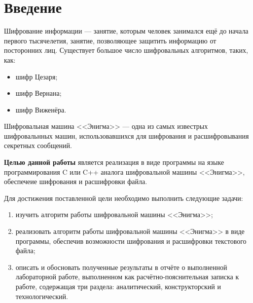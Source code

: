 \chapter*{Введение}

Шифрование информации --- занятие, которым человек занимался ещё до начала первого тысячелетия, занятие, позволяющее защитить информацию от посторонних лиц. 
Существует большое число шифровальных алгоритмов, таких, как:
\begin{itemize}[label=---]
    \item шифр Цезаря;
    \item шифр Вернана;
    \item шифр Виженёра.
\end{itemize}


Шифровальная машина <<Энигма>> --- одна из самых известрых шифровальнных машин, использовавшихся для шифрования и расшифровывания секретных сообщений.

\textbf{Целью данной работы} является реализация в виде программы на языке программирования C или C++ аналога шифровальной машины <<Энигма>>, обеспечеие шифрования и расшифровки файла. 

Для достижения поставленной цели необходимо выполнить следующие задачи:
\begin{enumerate}[label=\arabic*)]
	\item изучить алгоритм работы шифровальной машины <<Энигма>>;
    \item реализовать алгоритм работы шифровальной машины <<Энигма>> в виде программы, обеспечив возможности шифрования и расшифровки текстового файла;
	\item описать и обосновать полученные результаты в отчёте о выполненной лабораторной работе, выполненном как расчётно-пояснительная записка к работе, содержащая три раздела: аналитический, конструкторский и технологический.
\end{enumerate}
